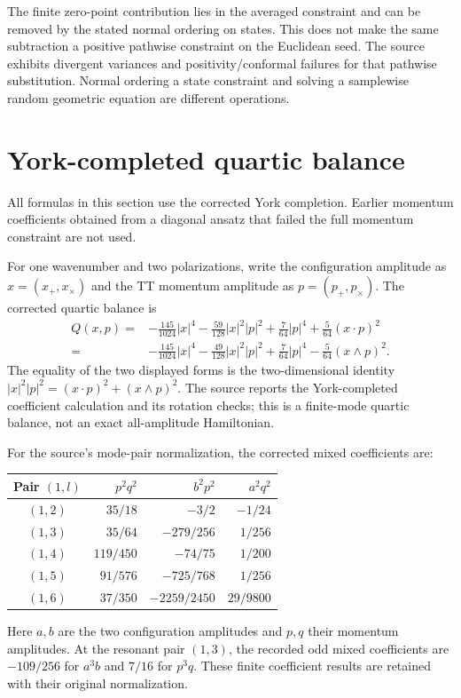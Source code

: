 \documentclass[11pt,a4paper,oneside]{book}
\theoremstyle{plain}
\theoremstyle{definition}
\theoremstyle{remark}
\newcommand{\src}[2]{\cite{#1}}
\begin{document}
The finite zero-point contribution lies in the averaged constraint and can be removed by the stated normal ordering on states. This does not make the same subtraction a positive pathwise constraint on the Euclidean seed. The source exhibits divergent variances and positivity/conformal failures for that pathwise substitution. Normal ordering a state constraint and solving a samplewise random geometric equation are different operations.

\section{York-completed quartic balance}
All formulas in this section use the corrected York completion. Earlier momentum coefficients obtained from a diagonal ansatz that failed the full momentum constraint are not used.

For one wavenumber and two polarizations, write the configuration amplitude as $x=(x_+,x_\times)$ and the TT momentum amplitude as $p=(p_+,p_\times)$. The corrected quartic balance is
\begin{equation}
\begin{split}
 Q(x,p)={}&-\frac{145}{1024}|x|^4
 -\frac{59}{128}|x|^2|p|^2+\frac7{64}|p|^4
 +\frac5{64}(x\cdot p)^2\\
 ={}&-\frac{145}{1024}|x|^4
 -\frac{49}{128}|x|^2|p|^2+\frac7{64}|p|^4
 -\frac5{64}(x\wedge p)^2.
\end{split}
\label{eq:quartic-york}
\end{equation}
The equality of the two displayed forms is the two-dimensional identity $|x|^2|p|^2=(x\cdot p)^2+(x\wedge p)^2$. The source reports the York-completed coefficient calculation and its rotation checks; this is a finite-mode quartic balance, not an exact all-amplitude Hamiltonian. \src{R19}{thm:v19v86-form}

For the source's mode-pair normalization, the corrected mixed coefficients are:
\begin{center}
\begin{tabular}{c r r r}
\toprule
Pair $(1,l)$ & $p^2q^2$ & $b^2p^2$ & $a^2q^2$\\
\midrule
$(1,2)$ & $35/18$ & $-3/2$ & $-1/24$\\
$(1,3)$ & $35/64$ & $-279/256$ & $1/256$\\
$(1,4)$ & $119/450$ & $-74/75$ & $1/200$\\
$(1,5)$ & $91/576$ & $-725/768$ & $1/256$\\
$(1,6)$ & $37/350$ & $-2259/2450$ & $29/9800$\\
\bottomrule
\end{tabular}
\end{center}
Here $a,b$ are the two configuration amplitudes and $p,q$ their momentum amplitudes. At the resonant pair $(1,3)$, the recorded odd mixed coefficients are $-109/256$ for $a^3b$ and $7/16$ for $p^3q$. These finite coefficient results are retained with their original normalization. \src{R19}{thm:v19v84-pairs}
\end{document}
